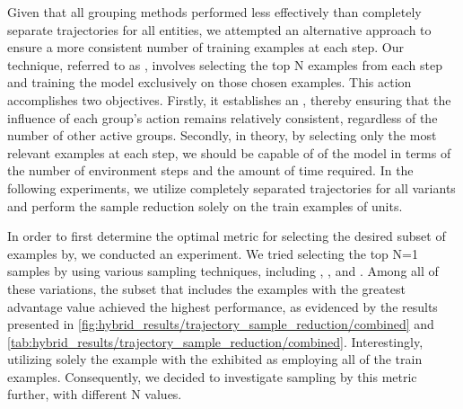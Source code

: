 \noindent Given that all grouping methods performed less effectively than completely separate trajectories for all entities, we attempted an alternative approach to ensure a more consistent number of training examples at each step. Our technique, referred to as , involves selecting the top N examples from each step and training the model exclusively on those chosen examples. This action accomplishes two objectives. Firstly, it establishes an , thereby ensuring that the influence of each group's action remains relatively consistent, regardless of the number of other active groups. Secondly, in theory, by selecting only the most relevant examples at each step, we should be capable of  of the model in terms of the number of environment steps and the amount of time required. In the following experiments, we utilize completely separated trajectories for all variants and perform the sample reduction solely on the train examples of units.

\bigskip

\noindent In order to first determine the optimal metric for selecting the desired subset of examples by, we conducted an experiment. We tried selecting the top N=1 samples by using various sampling techniques, including , ,  and . Among all of these variations, the subset that includes the examples with the greatest advantage value achieved the highest performance, as evidenced by the results presented in \autoref{fig:hybrid_results/trajectory_sample_reduction/combined} and \autoref{tab:hybrid_results/trajectory_sample_reduction/combined}. Interestingly, utilizing solely the example with the  exhibited  as employing all of the train examples. Consequently, we decided to investigate sampling by this metric further, with different N values.

